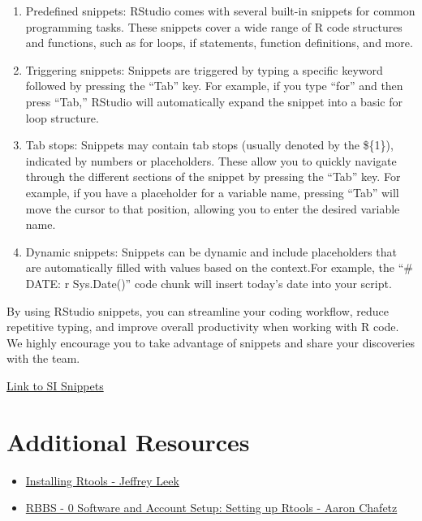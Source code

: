\documentclass[
  letterpaper,
  DIV=11,
  numbers=noendperiod]{scrreprt}
\providecommand{\tightlist}{%
  \setlength{\itemsep}{0pt}\setlength{\parskip}{0pt}}\usepackage{longtable,booktabs,array}
\begin{document}
\begin{enumerate}
\def\labelenumi{\arabic{enumi})}
\tightlist
\item
  Predefined snippets: RStudio comes with several built-in snippets for
  common programming tasks. These snippets cover a wide range of R code
  structures and functions, such as for loops, if statements, function
  definitions, and more.
\item
  Triggering snippets: Snippets are triggered by typing a specific
  keyword followed by pressing the ``Tab'' key. For example, if you type
  ``for'' and then press ``Tab,'' RStudio will automatically expand the
  snippet into a basic for loop structure.
\item
  Tab stops: Snippets may contain tab stops (usually denoted by the
  \$\{1\}), indicated by numbers or placeholders. These allow you to
  quickly navigate through the different sections of the snippet by
  pressing the ``Tab'' key. For example, if you have a placeholder for a
  variable name, pressing ``Tab'' will move the cursor to that position,
  allowing you to enter the desired variable name.
\item
  Dynamic snippets: Snippets can be dynamic and include placeholders
  that are automatically filled with values based on the context.For
  example, the ``\# DATE: r Sys.Date()'' code chunk will insert today's
  date into your script.
\end{enumerate}

By using RStudio snippets, you can streamline your coding workflow,
reduce repetitive typing, and improve overall productivity when working
with R code. We highly encourage you to take advantage of snippets and
share your discoveries with the team.

\href{https://gist.github.com/tessam30/fc775a2f917ea5d62de0f6724c4aeada}{Link
to SI Snippets}

\hypertarget{additional-resources}{%
\section{Additional Resources}\label{additional-resources}}

\begin{itemize}
\tightlist
\item
  \href{http://jtleek.com/modules/01_DataScientistToolbox/02_10_rtools/\#1}{Installing
  Rtools - Jeffrey Leek}
\item
  \href{https://usaid-oha-si.github.io/corps/rbbs/2022/01/28/rbbs-0-setup.html}{RBBS
  - 0 Software and Account Setup: Setting up Rtools - Aaron Chafetz}
\end{itemize}
\end{document}
